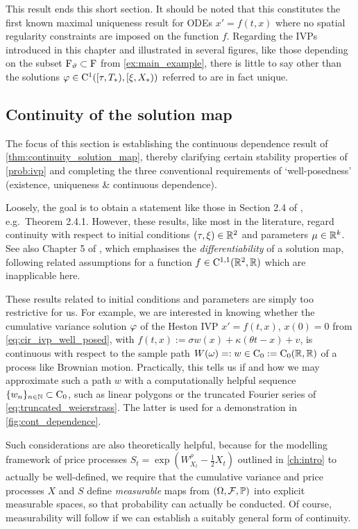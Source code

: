 This result ends this short section. It should be noted that this constitutes the first known maximal uniqueness result for ODEs $x'=f(t,x)$ where no spatial regularity constraints are imposed on the function $f$. Regarding the IVPs introduced in this chapter and illustrated in several figures, like those depending on the subset $\mathrm{F}_\vartheta\subset\mathrm{F}$ from \autoref{ex:main_example}, there is little to say other than the solutions $\varphi\in\mathrm{C}^1([\tau,T_*),[\xi,X_*))$ referred to are in fact unique.

\subsection{Continuity of the solution map}\label{sec:cont_dep}

The focus of this section is establishing the continuous dependence result of \autoref{thm:continuity_solution_map}, thereby clarifying certain stability properties of \autoref{prob:ivp} and completing the three conventional requirements of `well-posedness' (existence, uniqueness \& continuous dependence).

Loosely, the goal is to obtain a statement like those in Section 2.4 of \cite{coddington_1955}, e.g.~Theorem 2.4.1. However, these results, like most in the literature, regard continuity with respect to initial conditions $(\tau,\xi)\in\mathbb{R}^2$ and parameters $\mu\in\mathbb{R}^k$. See also Chapter 5 of \cite{hartman_2002}, which emphasises the \emph{differentiability} of a solution map, following related assumptions for a function $f\in\mathrm{C}^{1,1}(\mathbb{R}^2,\mathbb{R})$ which are inapplicable here.

These results related to initial conditions and parameters are simply too restrictive for us. For example, we are interested in knowing whether the cumulative variance solution $\varphi$ of the Heston IVP $x'=f(t,x)$, $x(0)=0$ from
\autoref{eq:cir_ivp_well_posed}, with $f(t,x) := \sigma w(x) + \kappa(\theta t - x) + v$, is continuous with respect to the sample path $W(\omega)=:w\in\mathrm{C}_0:=\mathrm{C}_0(\mathbb{R},\mathbb{R})$ of a process like Brownian motion. Practically, this tells us if and how we may approximate such a path $w$ with a computationally helpful sequence $\{w_n\}_{n\in\mathbb{N}}\subset\mathrm{C}_0$, such as linear polygons or the truncated Fourier series of \autoref{eq:truncated_weierstrass}. The latter is used for a demonstration in \autoref{fig:cont_dependence}.

Such considerations are also theoretically helpful, because for the modelling framework of price processes $S_t=\exp(W^\rho_{X_t}-\frac12 X_t)$ outlined in \autoref{ch:intro} to actually be well-defined, we require that the cumulative variance and price processes $X$ and $S$ define \emph{measurable} maps from $(\Omega,\mathcal{F},\mathbb{P})$ into explicit measurable spaces, so that probability can actually be conducted. Of course, measurability will follow if we can establish a suitably general form of continuity.

